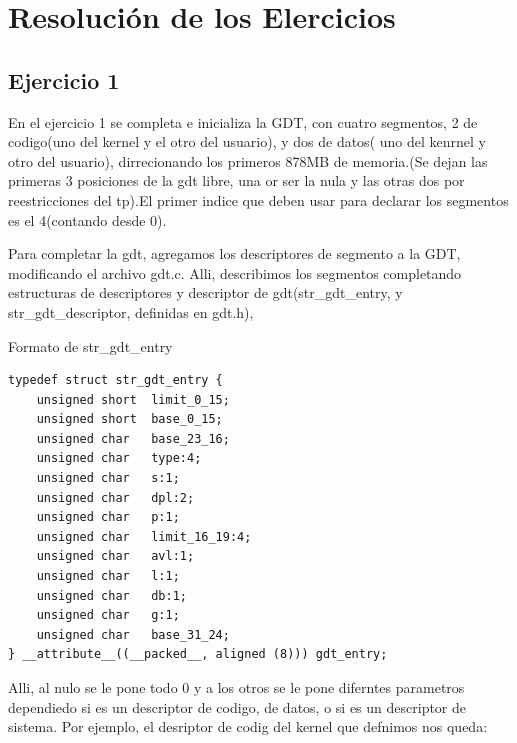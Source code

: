 \documentclass[a4paper]{article}
\newenvironment{codesnippet}{%
	\begin{Sbox}\begin{minipage}{\textwidth}\sffamily\small}%
	{\end{minipage}\end{Sbox}%
		\begin{center}%
		\vspace{-0.4cm}\colorbox{litegrey}{\TheSbox}\end{center}\vspace{0.3cm}}
\begin{document}
\section{Resolución de los Elercicios}
\subsection{Ejercicio 1}

En el ejercicio 1 se completa e inicializa la GDT, con cuatro segmentos, 2 de codigo(uno del kernel y el otro del usuario), y dos de datos( uno del kenrnel y otro del usuario), dirrecionando los primeros 878MB de memoria.(Se dejan las primeras 3 posiciones de la gdt libre, una or ser la nula y las otras dos por reestricciones del tp).El primer indice que deben usar para declarar los segmentos es el 4(contando desde 0).


Para completar la gdt, agregamos los descriptores de segmento a la GDT, modificando el archivo gdt.c.
Alli, describimos los segmentos completando  estructuras de descriptores y descriptor de gdt(str_gdt_entry, y  str_gdt_descriptor, definidas en gdt.h),


Formato de str_gdt_entry

\begin{codesnippet}
\begin{verbatim}
typedef struct str_gdt_entry {
    unsigned short  limit_0_15;
    unsigned short  base_0_15;
    unsigned char   base_23_16;
    unsigned char   type:4;
    unsigned char   s:1;
    unsigned char   dpl:2;
    unsigned char   p:1;
    unsigned char   limit_16_19:4;
    unsigned char   avl:1;
    unsigned char   l:1;
    unsigned char   db:1;
    unsigned char   g:1;
    unsigned char   base_31_24;
} __attribute__((__packed__, aligned (8))) gdt_entry;    
\end{verbatim}
\end{codesnippet}


Alli, al nulo se le pone todo 0 y a los otros se le pone diferntes parametros dependiedo si es un descriptor de codigo, de datos, o si es un descriptor de sistema. Por ejemplo, el desriptor de codig del kernel que defnimos nos queda:
\end{document}
